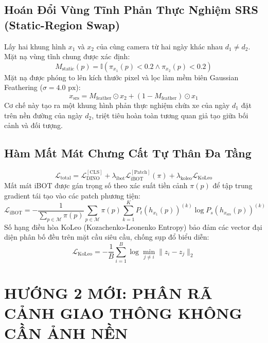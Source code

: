 \documentclass[11pt,a4paper]{article}
\begin{document}
\subsection{Hoán Đổi Vùng Tĩnh Phản Thực Nghiệm SRS (Static-Region Swap)}
Lấy hai khung hình $x_1$ và $x_2$ của cùng camera từ hai ngày khác nhau $d_1 \ne d_2$. Mặt nạ vùng tĩnh chung được xác định:
\begin{equation}
    M_{\text{static}}(p) = \mathbb{I}(\pi_{x_1}(p) < 0.2 \land \pi_{x_2}(p) < 0.2)
\end{equation}
Mặt nạ được phóng to lên kích thước pixel và lọc làm mềm biên Gaussian Feathering ($\sigma = 4.0\text{ px}$):
\begin{equation}
    x_{\text{srs}} = M_{\text{feather}} \odot x_2 + (1 - M_{\text{feather}}) \odot x_1
\end{equation}
Cơ chế này tạo ra một khung hình phản thực nghiệm chứa xe của ngày $d_1$ đặt trên nền đường của ngày $d_2$, triệt tiêu hoàn toàn tương quan giả tạo giữa bối cảnh và đối tượng.

\subsection{Hàm Mất Mát Chưng Cất Tự Thân Đa Tầng}
\begin{equation}
    \mathcal{L}_{\text{total}} = \mathcal{L}_{\text{DINO}}^{[\text{CLS}]} + \lambda_{\text{ibot}} \mathcal{L}_{\text{iBOT}}^{[\text{Patch}]}(\pi) + \lambda_{\text{koleo}} \mathcal{L}_{\text{KoLeo}}
\end{equation}
Mất mát iBOT được gán trọng số theo xác suất tiền cảnh $\pi(p)$ để tập trung gradient tái tạo vào các patch phương tiện:
\begin{equation}
    \mathcal{L}_{\text{iBOT}} = - \frac{1}{\sum_{p \in \mathcal{M}} \pi(p)} \sum_{p \in \mathcal{M}} \pi(p) \sum_{k=1}^K P_t(h_{x_1}(p))^{(k)} \log P_s(h_{x_{\text{srs}}}(p))^{(k)}
\end{equation}
Số hạng điều hòa KoLeo (Kozachenko-Leonenko Entropy) bảo đảm các vector đại diện phân bố đều trên mặt cầu siêu cầu, chống sụp đổ biểu diễn:
\begin{equation}
    \mathcal{L}_{\text{KoLeo}} = - \frac{1}{B} \sum_{i=1}^B \log \min_{j \ne i} \|z_i - z_j\|_2
\end{equation}

\section{HƯỚNG 2 MỚI: PHÂN RÃ CẢNH GIAO THÔNG KHÔNG CẦN ẢNH NỀN}
\end{document}
